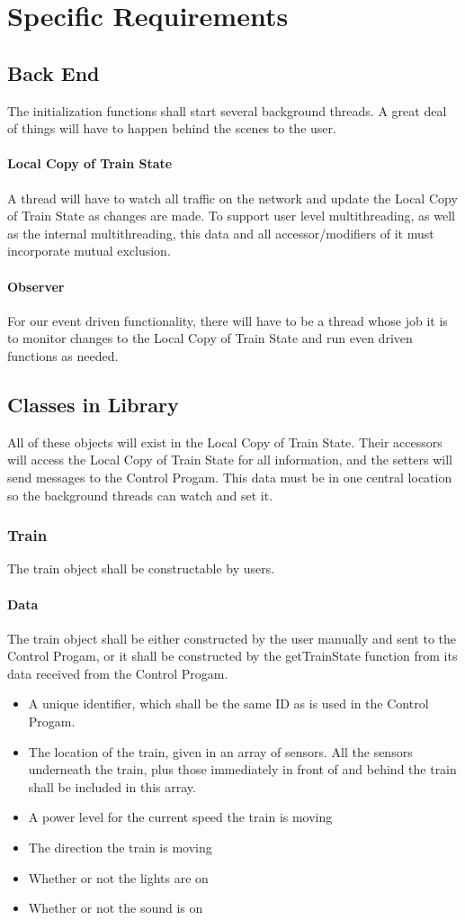\documentclass[a4paper,11pt,notitlepage]{article}
\def\CS{Control Progam\xspace}
\def\LC{Local Copy of Train State\xspace}
\begin{document}
\newpage
\section{Specific Requirements}
\subsection{Back End}
The initialization functions shall start several background threads. A great deal of things will have to happen behind the scenes to the user.
\paragraph{\LC} A thread will have to watch all traffic on the network and update the \LC as changes are made. To support user level multithreading, as well as the internal multithreading, this data and all accessor/modifiers of it must incorporate mutual exclusion.
\paragraph{Observer} For our event driven functionality, there will have to be a thread whose job it is to monitor changes to the \LC and run even driven functions as needed.

\subsection{Classes in Library}
All of these objects will exist in the \LC. Their accessors will access the \LC for all information, and the setters will send messages to the \CS. This data must be in one central location so the background threads can watch and set it.
\subsubsection{Train}
The train object shall be constructable by users.
\paragraph{Data}
The train object shall be either constructed by the user manually and sent to the \CS, or it shall be constructed by the getTrainState function from its data received from the \CS.
\begin{itemize}
\item A unique identifier, which shall be the same ID as is used in the \CS.
\item The location of the train, given in an array of sensors. All the sensors underneath the train, plus those immediately in front of and behind the train shall be included in this array.
\item A power level for the current speed the train is moving
\item The direction the train is moving
\item Whether or not the lights are on
\item Whether or not the sound is on
\end{itemize}
\end{document}
